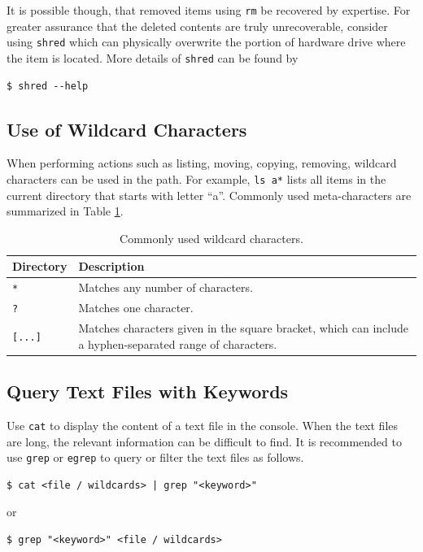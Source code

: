 It is possible though, that removed items using \verb|rm| be recovered by expertise. For greater assurance that the deleted contents are truly unrecoverable, consider using \verb|shred| which can physically overwrite the portion of hardware drive where the item is located. More details of \verb|shred| can be found by
\begin{lstlisting}
$ shred --help
\end{lstlisting}

\subsection{Use of Wildcard Characters}

When performing actions such as listing, moving, copying, removing, wildcard characters can be used in the path. For example, \verb|ls a*| lists all items in the current directory that starts with letter ``a''. Commonly used meta-characters are summarized in Table \ref{ch:fm:tab:metacharacters}.

\begin{table}
  \centering \caption{Commonly used wildcard characters.}\label{ch:fm:tab:metacharacters}
  \begin{tabularx}{\textwidth}{lX}
    \hline
    Directory & Description \\ \hline
    \verb|*| & Matches any number of characters. \\ 
    \verb|?| & Matches one character. \\ 
    \verb|[...]| & Matches characters given in the square bracket, which can include a hyphen-separated range of characters. \\
    \hline
  \end{tabularx}
\end{table}

\subsection{Query Text Files with Keywords}

Use \verb|cat| to display the content of a text file in the console. When the text files are long, the relevant information can be difficult to find. It is recommended to use \verb|grep| or \verb|egrep| to query or filter the text files as follows.
\begin{lstlisting}
$ cat <file / wildcards> | grep "<keyword>"
\end{lstlisting}
or
\begin{lstlisting}
$ grep "<keyword>" <file / wildcards>
\end{lstlisting}

